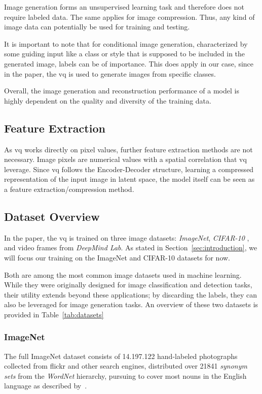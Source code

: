 Image generation forms an unsupervised learning task and therefore does not require labeled data.
The same applies for image compression.
Thus, any kind of image data can potentially be used for training and testing.

It is important to note that for conditional image generation, characterized by some guiding input like a class or
style that is supposed to be included in the generated image, labels can be of importance.
This does apply in our case, since in the paper, the \ac{vq} is used to generate images from specific classes.

Overall, the image generation and reconstruction performance of a model is highly dependent on the quality and diversity
of the training data.

\subsection{Feature Extraction}\label{subsec:feature-extraction}
As \ac{vq} works directly on pixel values, further feature extraction methods are not necessary.
Image pixels are numerical values with a spatial correlation that \ac{vq} leverage.
Since \ac{vq} follows the Encoder-Decoder structure, learning a compressed representation of the input image in latent
space, the model itself can be seen as a feature extraction/compression method.

\subsection{Dataset Overview}\label{subsec:dataset-overview}
In the paper, the \ac{vq} is trained on three image datasets: \textit{ImageNet}, \textit{CIFAR-10}
, and video frames from \textit{DeepMind Lab}.
As stated in Section~\ref{sec:introduction}, we will focus our training on the ImageNet and CIFAR-10
datasets for now.

Both are among the most common image datasets used in machine learning.
While they were originally designed for image classification and detection tasks, their utility extends beyond
these applications; by discarding the labels, they can also be leveraged for image generation tasks.
An overview of these two datasets is provided in Table~\ref{tab:datasets}

\subsubsection{ImageNet}\label{subsec:imagenet}
The full ImageNet dataset consists of 14.197.122 hand-labeled photographs collected from flickr and other search
engines, distributed over 21841 \textit{synonym sets} from the
\textit{WordNet} hierarchy, pursuing to cover most nouns in the English language as described by~\cite{wordnet}.

